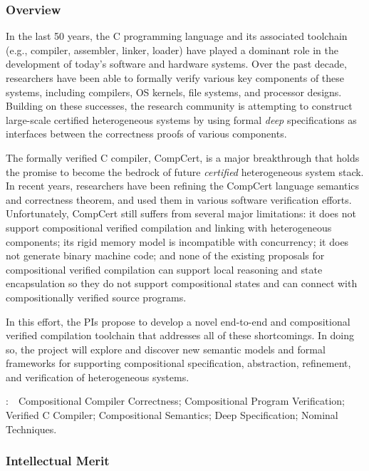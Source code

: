 \subsubsection*{Overview}

In the last 50 years, the C programming language and its associated
toolchain (e.g., compiler, assembler, linker, loader) have played a
dominant role in the development of today's software and hardware
systems.  Over the past decade, researchers have been able to formally
verify various key components of these systems, including compilers,
OS kernels, file systems, and processor designs. Building on these
successes, the research community is attempting to construct
large-scale certified heterogeneous systems by using formal {\em deep}
specifications as interfaces between the correctness proofs of various
components.

The formally verified C compiler, CompCert, is a major breakthrough
that holds the promise to become the bedrock of future {\em certified}
heterogeneous system stack. In recent years, researchers have been
refining the CompCert language semantics and correctness theorem, and
used them in various software verification efforts.  Unfortunately,
CompCert still suffers from several major limitations: it does not
support compositional verified compilation and linking with
heterogeneous components; its rigid memory model is incompatible with
concurrency; it does not generate binary machine code; and none of the
existing proposals for compositional verified compilation can support
local reasoning and state encapsulation so they do not support
compositional states and can connect with compositionally verified
source programs.

In this effort, the PIs propose to develop a novel end-to-end and
compositional verified
compilation toolchain that addresses all of these shortcomings. In
doing so, the project will explore and discover new semantic
models and formal frameworks for supporting compositional
specification, abstraction, refinement, and verification of
heterogeneous systems. 

\vspace{+2mm}
:~~{Compositional Compiler Correctness;
Compositional Program Verification; Verified C Compiler;
Compositional Semantics; Deep Specification; Nominal Techniques.}

\subsubsection*{Intellectual Merit}

